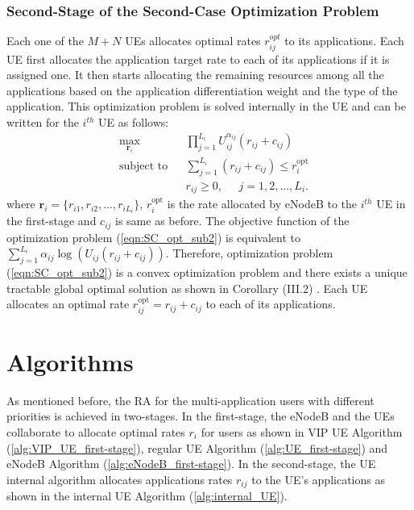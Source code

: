 \documentclass[journal]{IEEEtran} 				\IEEEoverridecommandlockouts 						\usepackage{amsmath,amssymb}
\begin{document}
\subsubsection{Second-Stage of the Second-Case Optimization Problem}\label{SC-SS-RA}
Each one of the $M+N$ UEs allocates optimal rates $r_{ij}^{opt}$ to its applications. Each UE first allocates the application target rate to each of its applications if it is assigned one. It then starts allocating the remaining resources among all the applications based on the application differentiation weight and the type of the application. This optimization problem is solved internally in the UE and can be written for the $i^{th}$ UE as follows:
\begin{equation}\label{eqn:SC_opt_sub2}
\begin{aligned}
& \underset{\textbf{r}_i}{\text{max}}
& & \prod_{j=1}^{L_i}U_{ij}^{\alpha_{ij}}(r_{ij}+c_{ij}) \\
& \text{subject to}
& & \sum_{j=1}^{L_i}(r_{ij}+c_{ij}) \leq r_i^{\text{opt}}\\
& & & r_{ij} \geq 0, \;\;\;\;\; j = 1,2, ...,L_i.
\end{aligned}
\end{equation}
where $\textbf{r}_i =\{r_{i1},r_{i2},...,r_{iL_{i}}\}$, $r_{i}^{\text{opt}}$ is the rate allocated by eNodeB to the $i^{th}$ UE in the first-stage and $c_{ij}$ is same as before.
The objective function of the optimization problem (\ref{eqn:SC_opt_sub2}) is equivalent to $\sum_{j=1}^{L_i}\alpha_{ij} \log(U_{ij}(r_{ij}+c_{ij}))$. Therefore, optimization problem (\ref{eqn:SC_opt_sub2}) is a convex optimization problem and there exists a unique tractable global optimal solution as shown in Corollary (III.2) \cite{Ahmed_Utility3}. Each UE allocates an optimal rate $r_{ij}^{\text{opt}}=r_{ij}+c_{ij}$ to each of its applications.
\section{Algorithms}\label{sec:two-stage-alg}
As mentioned before, the RA for the multi-application users with different priorities is achieved in two-stages. In the first-stage, the eNodeB and the UEs collaborate to allocate optimal rates $r_i$ for users as shown in VIP UE Algorithm (\ref{alg:VIP_UE_first-stage}), regular UE Algorithm (\ref{alg:UE_first-stage}) and eNodeB Algorithm (\ref{alg:eNodeB_first-stage}). In the second-stage, the UE internal algorithm allocates applications rates $r_{ij}$ to the UE's applications as shown in the internal UE Algorithm (\ref{alg:internal_UE}).
\end{document}
